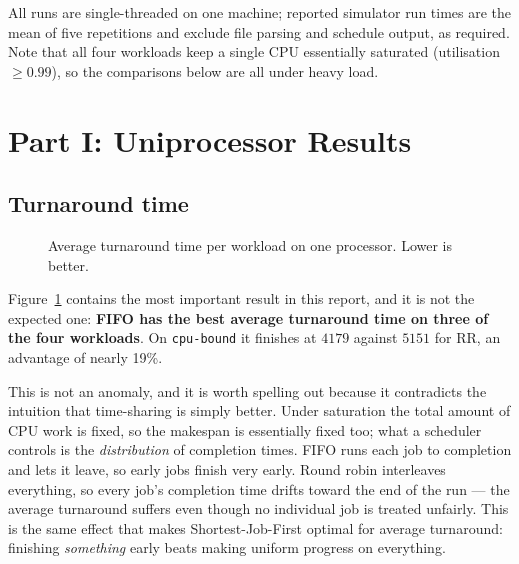 \documentclass[11pt,a4paper]{article}
\begin{document}
All runs are single-threaded on one machine; reported simulator run times are
the mean of five repetitions and exclude file parsing and schedule output, as
required. Note that all four workloads keep a single CPU essentially saturated
(utilisation $\geq 0.99$), so the comparisons below are all under heavy load.

\section{Part I: Uniprocessor Results}

\subsection{Turnaround time}

\begin{figure}[h]
\centering
{}
\caption{Average turnaround time per workload on one processor. Lower is
better.}
\label{fig:tat1}
\end{figure}

Figure~\ref{fig:tat1} contains the most important result in this report, and it
is not the expected one: \textbf{FIFO has the best average turnaround time on
three of the four workloads}. On \texttt{cpu-bound} it finishes at $4179$
against $5151$ for RR, an advantage of nearly 19\%.

This is not an anomaly, and it is worth spelling out because it contradicts the
intuition that time-sharing is simply better. Under saturation the total amount
of CPU work is fixed, so the makespan is essentially fixed too; what a
scheduler controls is the \emph{distribution} of completion times. FIFO runs
each job to completion and lets it leave, so early jobs finish very early.
Round robin interleaves everything, so every job's completion time drifts
toward the end of the run --- the average turnaround suffers even though no
individual job is treated unfairly. This is the same effect that makes
Shortest-Job-First optimal for average turnaround: finishing \emph{something}
early beats making uniform progress on everything.
\end{document}
